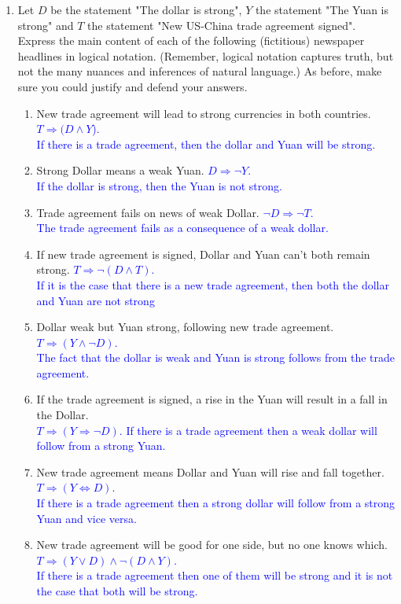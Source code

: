 \documentclass[13.5pt]{article}
\begin{document}
\begin{enumerate}
\item{Let \(D\) be the statement "The dollar is strong", \(Y\) the statement "The Yuan is strong" and \(T\) the statement "New US-China trade agreement signed". Express the main content of each of the following (fictitious) newspaper headlines in logical notation. (Remember, logical notation captures truth, but not the many nuances and inferences of natural language.) As before, make sure you could justify and defend your answers.}

\begin{enumerate}
\item {New trade agreement will lead to strong currencies in both countries.} \textcolor{blue}{\(T \Rightarrow (D\wedge Y\)).}\\
\textcolor{blue}{If there is a trade agreement, then the dollar and Yuan will be strong.}
\item {Strong Dollar means a weak Yuan.}  \textcolor{blue}{\(D \Rightarrow \neg Y\).}\\
\textcolor{blue}{If the dollar is strong, then the Yuan is not strong.}
\item {Trade agreement fails on news of weak Dollar.} \textcolor{blue}{\( \neg D\Rightarrow \neg T\).}\\
\textcolor{blue}{The trade agreement fails as a consequence of a weak dollar.}
\item {If new trade agreement is signed, Dollar and Yuan can't both remain strong.} \textcolor{blue}{\( T \Rightarrow \neg(D \wedge T)\).}\\ 
\textcolor{blue}{If it is the case that there is a new trade agreement, then both the dollar and Yuan are not strong}
\item {Dollar weak but Yuan strong, following new trade agreement.} \textcolor{blue}{\(T \Rightarrow (Y \wedge \neg D)\).}\\
\textcolor{blue}{The fact that the dollar is weak and Yuan is strong follows from the trade agreement.}
\item {If the trade agreement is signed, a rise in the Yuan will result in a fall in the Dollar.} \\ \textcolor{blue}{\(T\Rightarrow(Y \Rightarrow \neg D)\).} \textcolor{blue}{If there is a trade agreement then a weak dollar will follow from a strong Yuan.}
\item {New trade agreement means Dollar and Yuan will rise and fall together.} \textcolor{blue}{\(T\Rightarrow(Y \Leftrightarrow D)\).}\\ 
\textcolor{blue}{If there is a trade agreement then a strong dollar will follow from a strong Yuan and vice versa.}
\item {New trade agreement will be good for one side, but no one knows which.} \textcolor{blue}{\(T\Rightarrow(Y \vee D)\wedge \neg(D\wedge Y)\).}\\ 
\textcolor{blue}{If there is a trade agreement then one of them will be strong and it is not the case that both will be strong.}
\end{enumerate}


\end{enumerate}
\end{document}
